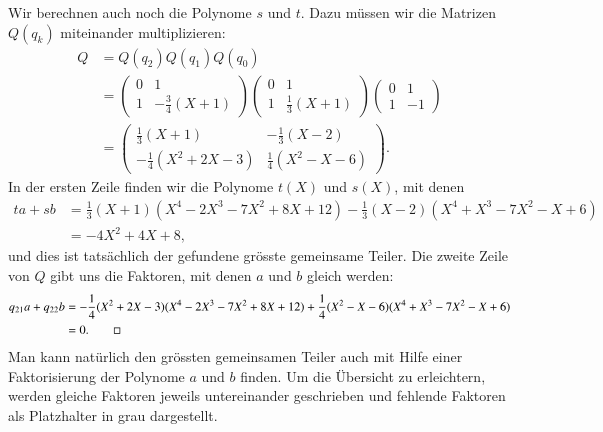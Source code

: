 \begin{beispiel}
Wir berechnen auch noch die Polynome $s$ und $t$.
Dazu müssen wir die Matrizen $Q(q_k)$ miteinander multiplizieren:
\begin{align*}
Q
&=Q(q_2) Q(q_1) Q(q_0)
\\
&=
\begin{pmatrix} 0 & 1 \\ 1 & -\frac34(X+1) \end{pmatrix}
\begin{pmatrix} 0 & 1 \\ 1 & \frac13(X+1) \end{pmatrix}
\begin{pmatrix} 0 & 1 \\ 1 & -1 \end{pmatrix}
\\
&=
\begin{pmatrix}
\frac13(X+1)&-\frac13(X-2)\\
-\frac14(X^2+2X-3)&\frac14(X^2-X-6)
\end{pmatrix}.
\end{align*}
In der ersten Zeile finden wir die Polynome $t(X)$ und $s(X)$, mit denen
\begin{align*}
ta+sb
&=
\frac13(X+1)
(X^4-2X^3-7X^2+8X+12)
-\frac13(X-2)
(X^4+X^3-7X^2-X+6)
\\
&=
-4X^2+4X+8,
\end{align*}
und dies ist tatsächlich der gefundene grösste gemeinsame Teiler.
Die zweite Zeile von $Q$ gibt uns die Faktoren, mit denen
$a$ und $b$ gleich werden:
\begin{align*}
q_{21}a+q_{22}b
&=
-\frac14(X^2+2X-3)
(X^4-2X^3-7X^2+8X+12)
+\frac14(X^2-X-6)
(X^4+X^3-7X^2-X+6)
\\
&=0.
\qedhere
\end{align*}
Man kann natürlich den grössten gemeinsamen Teiler auch mit Hilfe einer
Faktorisierung der Polynome $a$ und $b$ finden.
Um die Übersicht zu erleichtern, werden gleiche Faktoren jeweils untereinander
geschrieben und fehlende Faktoren als Platzhalter in grau dargestellt.
\def\grau#1{\bgroup\color{gray!50}#1\egroup}
\begin{align*}

\end{align*}
\end{beispiel}
